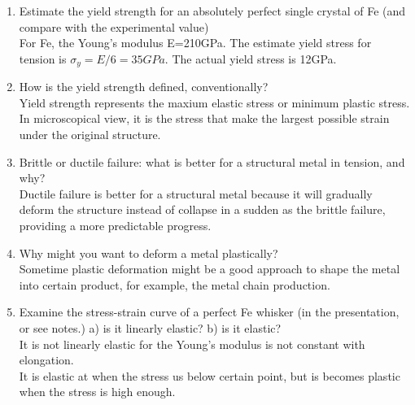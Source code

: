 \documentclass{article}
\begin{document}
\begin{enumerate}
\item Estimate the yield strength for an absolutely perfect single crystal of Fe 
(and compare with the experimental value)\\
For Fe, the Young's modulus E=210GPa. The estimate yield stress for tension is
$\sigma_y = E/6= 35GPa$. The actual yield stress is 12GPa.

\item How is the yield strength defined, conventionally?\\ 
Yield strength represents the maxium elastic stress or minimum plastic stress. In microscopical view, 
it is the stress that make the largest possible strain under the original structure.
\item Brittle or ductile failure: what is better for a structural metal in tension, and why?\\
Ductile failure is better for a structural metal because it will 
gradually deform the structure instead of collapse in a sudden as the brittle failure, providing
a more predictable progress.

\item Why might you want to deform a metal plastically? \\
Sometime plastic deformation might be a good approach 
to shape the metal into certain product, 
for example, the metal chain production.

\item Examine the stress-strain curve of a perfect Fe whisker (in the presentation, or see notes.) a) is it linearly elastic?  b) is it elastic? \\
It is not linearly elastic for the Young's modulus is not constant with elongation.\\
It is elastic at when the stress us below certain point, 
but is becomes plastic when the stress is high enough.




\end{enumerate}
\end{document}
